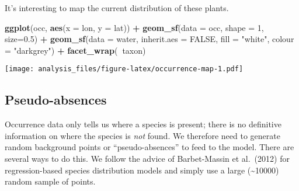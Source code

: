 \documentclass[]{article}
\newenvironment{Shaded}{\begin{snugshade}}{\end{snugshade}}
\newcommand{\ControlFlowTok}[1]{\textcolor[rgb]{0.13,0.29,0.53}{\textbf{#1}}}
\newcommand{\DataTypeTok}[1]{\textcolor[rgb]{0.13,0.29,0.53}{#1}}
\newcommand{\DecValTok}[1]{\textcolor[rgb]{0.00,0.00,0.81}{#1}}
\newcommand{\FloatTok}[1]{\textcolor[rgb]{0.00,0.00,0.81}{#1}}
\newcommand{\KeywordTok}[1]{\textcolor[rgb]{0.13,0.29,0.53}{\textbf{#1}}}
\newcommand{\NormalTok}[1]{#1}
\newcommand{\OperatorTok}[1]{\textcolor[rgb]{0.81,0.36,0.00}{\textbf{#1}}}
\newcommand{\OtherTok}[1]{\textcolor[rgb]{0.56,0.35,0.01}{#1}}
\newcommand{\StringTok}[1]{\textcolor[rgb]{0.31,0.60,0.02}{#1}}
\begin{document}
It's interesting to map the current distribution of these plants.

\begin{Shaded}
\begin{Highlighting}[]
\KeywordTok{ggplot}\NormalTok{(occ, }\KeywordTok{aes}\NormalTok{(}\DataTypeTok{x =}\NormalTok{ lon, }\DataTypeTok{y =}\NormalTok{ lat)) }\OperatorTok{+}
\StringTok{  }\KeywordTok{geom_sf}\NormalTok{(}\DataTypeTok{data =}\NormalTok{ occ, }\DataTypeTok{shape =} \DecValTok{1}\NormalTok{, }\DataTypeTok{size=}\FloatTok{0.5}\NormalTok{) }\OperatorTok{+}
\StringTok{  }\KeywordTok{geom_sf}\NormalTok{(}\DataTypeTok{data =}\NormalTok{ water, }\DataTypeTok{inherit.aes =} \OtherTok{FALSE}\NormalTok{, }\DataTypeTok{fill =} \StringTok{"white"}\NormalTok{, }\DataTypeTok{colour =} \StringTok{"darkgrey"}\NormalTok{) }\OperatorTok{+}
\StringTok{  }\KeywordTok{facet_wrap}\NormalTok{(}\OperatorTok{~}\NormalTok{taxon)}
\end{Highlighting}
\end{Shaded}

\texttt{[image: analysis\_files/figure-latex/occurrence-map-1.pdf]}

\hypertarget{pseudo-absences}{%
\subsection{Pseudo-absences}\label{pseudo-absences}}

Occurrence data only tells us where a species is present; there is no
definitive information on where the species is \emph{not} found. We
therefore need to generate random background points or
``pseudo-absences'' to feed to the model. There are several ways to do
this. We follow the advice of Barbet-Massin et al.~(2012) for
regression-based species distribution models and simply use a large
(\textasciitilde10000) random sample of points.

\begin{Shaded}
\end{Shaded}
\end{document}
